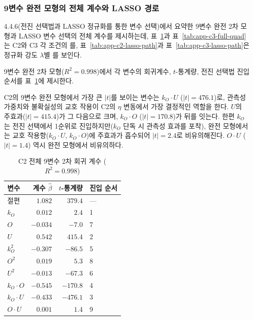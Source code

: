 

\subsubsection{9변수 완전 모형의 전체 계수와 LASSO 경로}
\label{subsec:full-coeff-detail}
4.4.6(전진 선택법과 LASSO 정규화를 통한 변수 선택)에서 요약한 9변수 완전 2차 모형과 LASSO 변수 선택의 전체 계수를 제시하는데,  \p{[}표~\ref{tab:app-c2-full-quad}\p{]}과 \p{[}표~\ref{tab:app-c3-full-quad}\p{]}는 C2와 C3 각 조건의 를,  \p{[}표~\ref{tab:app-c2-lasso-path}\p{]}과 \p{[}표~\ref{tab:app-c3-lasso-path}\p{]}은 정규화 강도 $\lambda$별 를 보인다.

 9변수 완전 2차 모형($R^2 = 0.998$)에서 각 변수의 회귀계수,
$t$-통계량, 전진 선택법 진입 순서를 \p{[}표~\ref{tab:app-c2-full-quad}\p{]}에 제시한다.

C2의 9변수 완전 모형에서 가장 큰 $|t|$를 보이는 변수는
$k_O \cdot U$ ($|t| = 476.1$)로, 관측성 가중치와 불확실성의
교호 작용이 C2의 $\eta$ 변동에서 가장 결정적인 역할을 한다.
$U$의 주효과($|t| = 415.4$)가 그 다음으로 크며,
$k_O \cdot O$ ($|t| = 170.8$)가 뒤를 잇는다.
한편 $k_O$는 전진 선택에서 1순위로 진입하지만($k_O$ 단독 시 관측성 효과를 포착),
완전 모형에서는 교호 작용항($k_O \cdot U$, $k_O \cdot O$)에 주효과가 흡수되어
$|t| = 2.4$로 비유의해진다.
$O \cdot U$ ($|t| = 1.4$) 역시 완전 모형에서 비유의하다.

\begin{table}[htbp]
\centering
\caption{C2 전체 9변수 2차 회귀 계수 ($R^2 = 0.998$)}
\label{tab:app-c2-full-quad}
\small
\begin{tabular}{lrrl}
\toprule
\textbf{변수} & \textbf{계수 $\hat{\beta}$} & \textbf{$t$-통계량} & \textbf{진입 순서} \\
\midrule
절편 & $1.082$ & $379.4$ & --- \\
$k_O$ & $0.012$ & $2.4$ & 1 \\
$O$ & $-0.034$ & $-7.0$ & 7 \\
$U$ & $0.542$ & $415.4$ & 2 \\
$k_O^2$ & $-0.307$ & $-86.5$ & 5 \\
$O^2$ & $0.019$ & $5.3$ & 8 \\
$U^2$ & $-0.013$ & $-67.3$ & 6 \\
$k_O \cdot O$ & $-0.545$ & $-170.8$ & 4 \\
$k_O \cdot U$ & $-0.433$ & $-476.1$ & 3 \\
$O \cdot U$ & $0.001$ & $1.4$ & 9 \\
\bottomrule
\end{tabular}
\end{table}



